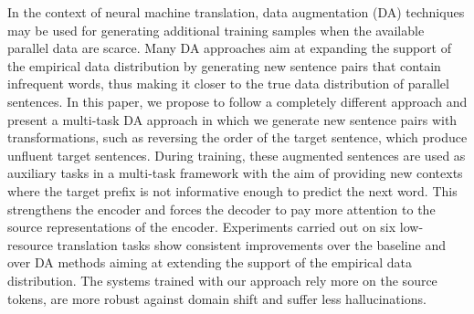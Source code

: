 In the context of neural machine translation, data augmentation (DA) techniques may be used for generating additional training samples when the available parallel data are scarce. Many DA approaches aim at expanding the support of the empirical data distribution by generating new sentence pairs that contain infrequent words, thus making it closer to the true data distribution of parallel sentences. In this paper, we propose to follow a completely different approach and present a multi-task DA approach in which we generate new sentence pairs with transformations, such as reversing the order of the target sentence, which produce unfluent target sentences. During training, these augmented sentences are used as auxiliary tasks in a multi-task framework with the aim of providing new contexts where the target prefix is not informative enough to predict the next word. This strengthens the encoder and forces the decoder to pay more attention to the source representations of the encoder. Experiments carried out on six low-resource translation tasks show consistent improvements over the baseline and over DA methods aiming at extending the support of the empirical data distribution. The systems trained with our approach rely more on the source tokens, are more robust against domain shift and suffer less hallucinations.
